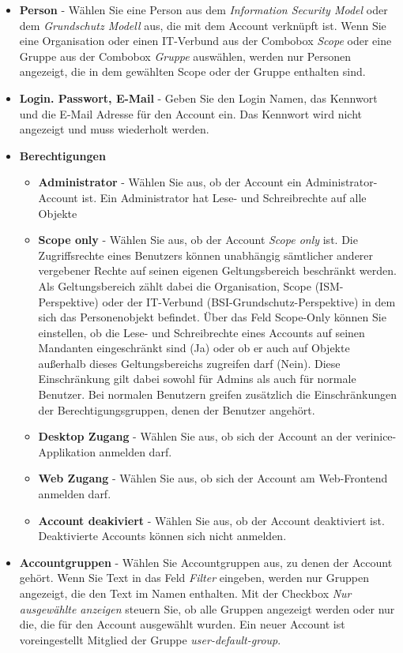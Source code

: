 \documentclass[a4paper,10pt]{book}
\begin{document}
\begin{itemize}
\item \textbf{Person} - Wählen Sie eine Person aus dem \textit{Information Security Model} oder dem \textit{Grundschutz Modell} aus, die mit dem Account verknüpft ist. Wenn Sie eine Organisation oder einen IT-Verbund aus der Combobox \textit{Scope} oder eine Gruppe aus der Combobox \textit{Gruppe} auswählen, werden nur Personen angezeigt, die in dem gewählten Scope oder der Gruppe enthalten sind.
\item \textbf{Login. Passwort, E-Mail} - Geben Sie den Login Namen, das Kennwort und die E-Mail Adresse für den Account ein. Das Kennwort wird nicht angezeigt und muss wiederholt werden.
\item \textbf{Berechtigungen} \begin{itemize}
\item \textbf{Administrator} - Wählen Sie aus, ob der Account ein Administrator-Account ist. Ein Administrator hat Lese- und Schreibrechte auf alle Objekte
\item \textbf{Scope only} - Wählen Sie aus, ob der Account \textit{Scope only} ist. Die Zugriffsrechte eines Benutzers können unabhängig sämtlicher anderer vergebener Rechte auf seinen eigenen Geltungsbereich beschränkt werden. Als Geltungsbereich zählt dabei die Organisation, Scope (ISM-Perspektive) oder der IT-Verbund (BSI-Grundschutz-Perspektive) in dem sich das Personenobjekt befindet. Über das Feld Scope-Only können Sie einstellen, ob die Lese- und Schreibrechte eines Accounts auf seinen Mandanten eingeschränkt sind (Ja) oder ob er auch auf Objekte außerhalb dieses Geltungsbereichs zugreifen darf (Nein).
Diese Einschränkung gilt dabei sowohl für Admins als auch für normale Benutzer. Bei normalen Benutzern greifen zusätzlich die Einschränkungen der Berechtigungsgruppen, denen der Benutzer angehört.
\item \textbf{Desktop Zugang} - Wählen Sie aus, ob sich der Account an der verinice-Applikation anmelden darf.
\item \textbf{Web Zugang} - Wählen Sie aus, ob sich der Account am Web-Frontend anmelden darf.
\item \textbf{Account deakiviert} - Wählen Sie aus, ob der Account deaktiviert ist. Deaktivierte Accounts können sich nicht anmelden.
\end{itemize}
\item \textbf{Accountgruppen} - Wählen Sie Accountgruppen aus, zu denen der Account gehört. Wenn Sie Text in das Feld \textit{Filter} eingeben, werden nur Gruppen angezeigt, die den Text im Namen enthalten. Mit der Checkbox \textit{Nur ausgewählte anzeigen} steuern Sie, ob alle Gruppen angezeigt werden oder nur die, die für den Account ausgewählt wurden. Ein neuer Account ist voreingestellt Mitglied der Gruppe \textit{user-default-group}.

\end{itemize}
\end{document}

